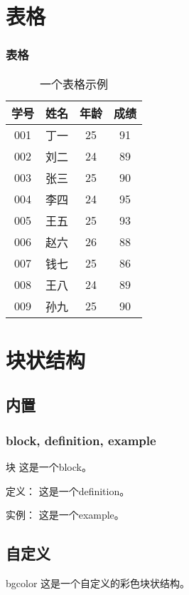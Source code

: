 \section{表格}
\begin{frame}
	\frametitle{表格}
    \begin{table}
    \centering
    \caption{一个表格示例}
    \begin{tabular}{|c|c|c|c|}
    \hline
    \rowcolor{blue!50}学号&姓名&年龄&成绩\\
    \hline
    001 & 丁一 & 25 & 91\\
    002 & 刘二 & 24 & 89\\
    003 & 张三 & 25 & 90\\
    004 & 李四 & 24 & 95\\
    005 & 王五 & 25 & 93\\
    006 & 赵六 & 26 & 88\\
    007 & 钱七 & 25 & 86\\
    008 & 王八 & 24 & 89\\
    009 & 孙九 & 25 & 90\\
    \hline
    \end{tabular}
    \end{table}
\end{frame}

\section{块状结构}
\subsection{内置}
\begin{frame}
	\frametitle{block, definition, example}
	\begin{block}{块}
	这是一个block。
	\end{block}
	\pause
	\begin{definition}{定义：}
	这是一个definition。
	\end{definition}
	\pause
	\begin{example}{实例：}
	这是一个example。
	\end{example}
\end{frame}
\subsection{自定义}
\begin{frame}
	\begin{beamercolorbox}[rounded=true,shadow=true,wd=12cm]{bgcolor}
		这是一个自定义的彩色块状结构。
	\end{beamercolorbox}
\end{frame}

